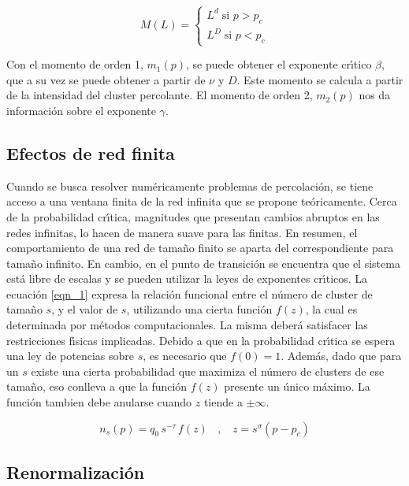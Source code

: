\documentclass[
 reprint,
 amsmath,amssymb,
 aps,
]{revtex4-1}
\begin{document}
\begin{equation}\label{masa_eqn}
    M(L) = \left \{ \begin{matrix} L^d \; \text{si } p > p_c \\  L^D \; \text{si } p < p_c \end{matrix} \right .
\end{equation}

Con el momento de orden 1, $m_1(p)$, se puede obtener el exponente cr\'\i tico $\beta$, que a su vez se puede obtener a partir de $\nu$ y $D$. Este momento se calcula a partir de la intensidad del cluster percolante. El momento de orden 2, $m_2(p)$ nos da informaci\'on sobre el exponente $\gamma$.

\subsection{\label{scaling}Efectos de red finita}

Cuando se busca resolver num\'ericamente problemas de percolaci\'on, se tiene acceso a una ventana finita de la red infinita que se propone te\'oricamente. Cerca de la probabilidad cr\'\i tica, magnitudes que presentan cambios abruptos en las redes infinitas, lo hacen de manera suave para las finitas. En resumen, el comportamiento de una red de tama\~no finito se aparta del correspondiente para tama\~no infinito. En cambio, en el punto de transici\'on se encuentra que el sistema est\'a libre de escalas y se pueden utilizar la leyes de exponentes cr\'\i ticos.
La ecuaci\'on \ref{eqn_1} expresa la relaci\'on funcional entre el n\'umero de cluster de tama\~no $s$, y el valor de $s$, utilizando una cierta funci\'on $f(z)$, la cual es determinada por m\'etodos computacionales. La misma deber\'a satisfacer las restricciones f\'\i sicas implicadas. Debido a que en la probabilidad cr\'\i tica se espera una ley de potencias sobre $s$, es necesario que $f(0)=1$. Adem\'as, dado que para un $s$ existe una cierta probabilidad que maximiza el n\'umero de clusters de ese tama\~no, eso conlleva a que la funci\'on $f(z)$ presente un \'unico m\'aximo. La funci\'on tambien debe anularse cuando $z$ tiende a $\pm \infty$.

\begin{equation}
n_s(p) = q_0\,s^{-\tau}\,f(z)\ \ \ \ ,\ \ \ \ z=s^\sigma(p-p_c)\label{eqn_1}
\end{equation}

\subsection{\label{renorm}Renormalizaci\'on}
\end{document}
